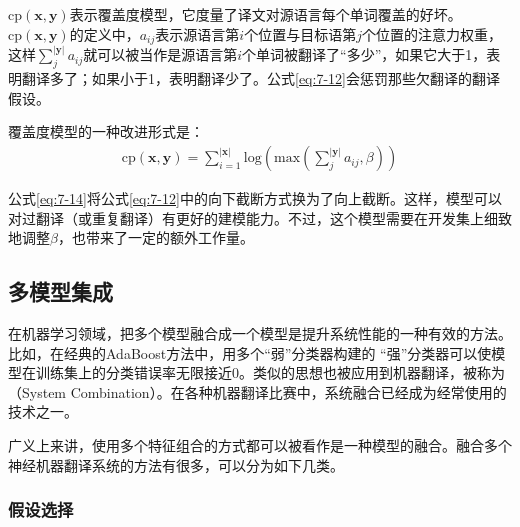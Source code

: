 \noindent $\textrm{cp}(\mathbf{x},\mathbf{y}) $表示覆盖度模型，它度量了译文对源语言每个单词覆盖的好坏。$\textrm{cp}(\mathbf{x},\mathbf{y}) $的定义中，$a_{ij}$表示源语言第$i$个位置与目标语第$j$个位置的注意力权重，这样$\sum_{j}^{|\mathbf{y}|} a_{ij}$就可以被当作是源语言第$i$个单词被翻译了``多少''，如果它大于1，表明翻译多了；如果小于1，表明翻译少了。公式\ref{eq:7-12}会惩罚那些欠翻译的翻译假设。

\parinterval 覆盖度模型的一种改进形式是\cite{li-etal-2018-simple}：
\begin{eqnarray}
\textrm{cp}(\mathbf{x},\mathbf{y}) = \sum_{i=1}^{|\mathbf{x}|} \textrm{log}( \textrm{max} ( \sum_{j}^{|\mathbf{y}|} a_{ij},\beta))
\label{eq:7-14}
\end{eqnarray}

\noindent 公式\ref{eq:7-14}将公式\ref{eq:7-12}中的向下截断方式换为了向上截断。这样，模型可以对过翻译（或重复翻译）有更好的建模能力。不过，这个模型需要在开发集上细致地调整$\beta$，也带来了一定的额外工作量。


\subsection{多模型集成}
\label{subsection-7.4.3}

\parinterval 在机器学习领域，把多个模型融合成一个模型是提升系统性能的一种有效的方法。比如，在经典的AdaBoost方法中\cite{DBLP:journals/jcss/FreundS97}，用多个``弱''分类器构建的 ``强''分类器可以使模型在训练集上的分类错误率无限接近0。类似的思想也被应用到机器翻译\cite{DBLP:conf/acl/XiaoZZW10,DBLP:conf/icassp/SimBGSW07,DBLP:conf/acl/RostiMS07,DBLP:conf/wmt/RostiZMS08}，被称为{\small{}}（System Combination）。在各种机器翻译比赛中，系统融合已经成为经常使用的技术之一。

\parinterval 广义上来讲，使用多个特征组合的方式都可以被看作是一种模型的融合。融合多个神经机器翻译系统的方法有很多，可以分为如下几类。


\subsubsection{假设选择}

